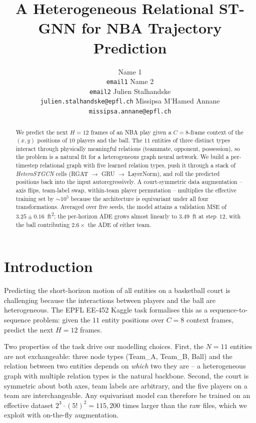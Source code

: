 \documentclass{article}
\title{A Heterogeneous Relational ST-GNN for NBA Trajectory Prediction}
\author{
Name 1 \\
\texttt{email1}
\AND
Name 2 \\
\texttt{email2}
\AND
Julien Stalhandske \\
\texttt{julien.stalhandske@epfl.ch}
\AND
Missipsa M'Hamed Annane \\
\texttt{missipsa.annane@epfl.ch}
}
\begin{document}
\maketitle

\begin{abstract}
We predict the next $H{=}12$ frames of an NBA play given a $C{=}8$-frame context
of the $(x, y)$ positions of $10$ players and the ball. The $11$ entities of
three distinct types interact through physically meaningful relations
(teammate, opponent, possession), so the problem is a natural fit for a
heterogeneous graph neural network. We build a per-timestep relational graph
with five learned relation types, push it through a stack of
\textit{HeteroSTGCN} cells (RGAT $\rightarrow$ GRU $\rightarrow$ LayerNorm),
and roll the predicted positions back into the input autoregressively. A
court-symmetric data augmentation -- axis flips, team-label swap, within-team
player permutation -- multiplies the effective training set by
$\sim\!10^5$ because the architecture is equivariant under all four
transformations. Averaged over five seeds, the model attains a validation MSE
of $3.25\pm 0.16$~ft\textsuperscript{2}; the per-horizon ADE grows almost
linearly to $3.49$~ft at step~$12$, with the ball contributing $2.6\times$
the ADE of either team.
\end{abstract}

\section{Introduction}
\label{sec:intro}

Predicting the short-horizon motion of all entities on a basketball court is
challenging because the interactions between players and the ball are
heterogeneous. The EPFL EE-452 Kaggle task formalises this as a
sequence-to-sequence problem: given the $11$ entity positions over
$C{=}8$ context frames, predict the next $H{=}12$ frames.

Two properties of the task drive our modelling choices. First, the
$N{=}11$ entities are not exchangeable: three node types (Team\_A, Team\_B,
Ball) and the relation between two entities depends on \emph{which} two they
are -- a heterogeneous graph with multiple relation types is the natural
backbone. Second, the court is symmetric about both axes, team labels are
arbitrary, and the five players on a team are interchangeable. Any
equivariant model can therefore be trained on an effective dataset
$2^3{\cdot}(5!)^2{=}115{,}200$ times larger than the raw files, which we
exploit with on-the-fly augmentation.
\end{document}
